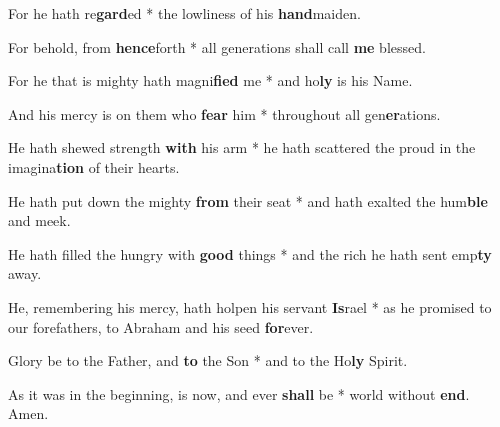 \begin{multicols}{2}
	For he hath re\textbf{gard}ed * the lowliness of his \textbf{hand}maiden.
	
	For behold, from \textbf{hence}forth * all generations shall call \textbf{me} blessed.
	
	For he that is mighty hath magni\textbf{fied} me * and ho\textbf{ly} is his Name.
	
	And his mercy is on them who \textbf{fear} him * throughout all gen\textbf{er}ations.
	
	He hath shewed strength \textbf{with} his arm * he hath scattered the proud in the imagina\textbf{tion} of their hearts.
	
	He hath put down the mighty \textbf{from} their seat * and hath exalted the hum\textbf{ble} and meek.
	
	He hath filled the hungry with \textbf{good} things * and the rich he hath sent emp\textbf{ty} away.
	
	He, remembering his mercy, hath holpen his servant \textbf{Is}rael * as he promised to our forefathers, to Abraham and his seed \textbf{for}ever.
	
	Glory be to the Father, and \textbf{to} the Son * and to the Ho\textbf{ly} Spirit.
	
	As it was in the beginning, is now, and ever \textbf{shall} be * world without \textbf{end}. Amen.
\end{multicols}